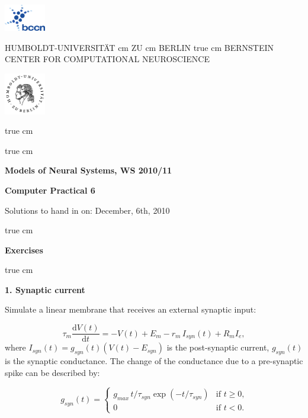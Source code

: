 \documentclass[12pt]{article}
\newcommand{\tderiv}[1]{\frac{\mathrm{d}#1}{\mathrm{d}t}}
\begin{document}
\parbox{2cm}{
\includegraphics[width=1.8cm]{bccnlogo.pdf}
}
\parbox{11cm}{
\begin{center}
\large HUMBOLDT-UNIVERSIT\"AT  cm ZU  cm BERLIN
 true cm
\mgross BERNSTEIN CENTER FOR COMPUTATIONAL NEUROSCIENCE
\end{center}
}
\parbox{2cm}
{
\hfill
\includegraphics[width=1.8cm]{hublogo.pdf}
}

 true cm



 true cm
\centerline{\bf Models of Neural Systems, WS 2010/11}
\centerline{\bf Computer Practical 6}
\centerline{Solutions to hand in on: December, 6th, 2010}

 true cm

{\bf Exercises}

 true cm

\textbf{1. Synaptic current} 

Simulate a linear membrane that receives an external synaptic input:

\begin{equation}
\tau_m \tderiv{V(t)}=-V(t)+E_m-r_m\,I_{syn}(t)+R_m I_e,
\label{eq:membrane}
\end{equation} 
where $I_{syn}(t)=g_{syn}(t)(V(t)-E_{syn})$ is the post-synaptic
current, $g_{syn}(t)$  is the synaptic conductance. The change of
the conductance due to a pre-synaptic spike can be described by:

\begin{equation}
 g_{syn}(t)= 
\begin{cases} g_{max}\,t/\tau_{syn}\exp\left(-t/\tau_{syn}\right) & \text{if $t\geq0$,}
\\
0 &\text{if $t<0$.}
\label{eq:synaptic_conductance}
\end{cases}
\end{equation} 
 
\end{document}
